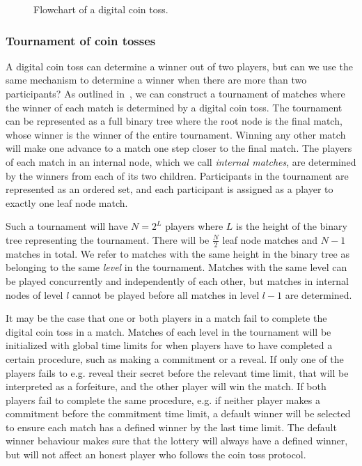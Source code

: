 \begin{figure}[htbp]
  \centering
  
  \caption{Flowchart of a digital coin toss.}
  \label{fig:digital-coin-toss-flow}
\end{figure}

\subsubsection{Tournament of coin tosses}
A digital coin toss can determine a winner out of two players, but can we use the same mechanism to determine a winner when there are more than two participants? As outlined in~\cite{bartoletti_constant-deposit_2017,miller_zero-collateral_2017}, we can construct a tournament of matches where the winner of each match is determined by a digital coin toss. The tournament can be represented as a full binary tree where the root node is the final match, whose winner is the winner of the entire tournament. Winning any other match will make one advance to a match one step closer to the final match. The players of each match in an internal node, which we call \emph{internal matches}, are determined by the winners from each of its two children. Participants in the tournament are represented as an ordered set, and each participant is assigned as a player to exactly one leaf node match. 

Such a tournament will have $N=2^L$ players where $L$ is the height of the binary tree representing the tournament. There will be $\frac{N}{2}$ leaf node matches and $N-1$ matches in total. We refer to matches with the same height in the binary tree as belonging to the same \emph{level} in the tournament. Matches with the same level can be played concurrently and independently of each other, but matches in internal nodes of level $l$ cannot be played before all matches in level $l-1$ are determined.

It may be the case that one or both players in a match fail to complete the digital coin toss in a match. Matches of each level in the tournament will be initialized with global time limits for when players have to have completed a certain procedure, such as making a commitment or a reveal. If only one of the players fails to e.g. reveal their secret before the relevant time limit, that will be interpreted as a forfeiture, and the other player will win the match. If both players fail to complete the same procedure, e.g. if neither player makes a commitment before the commitment time limit, a default winner will be selected to ensure each match has a defined winner by the last time limit. The default winner behaviour makes sure that the lottery will always have a defined winner, but will not affect an honest player who follows the coin toss protocol.


